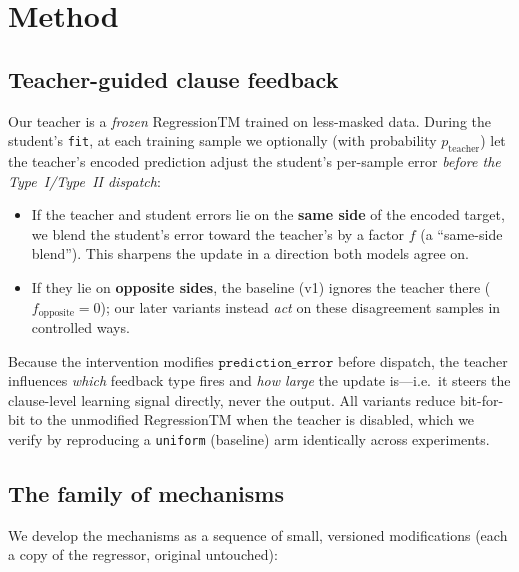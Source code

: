 \section{Method}
\label{sec:method}

\subsection{Teacher-guided clause feedback}

Our teacher is a \emph{frozen} RegressionTM trained on less-masked data. During the
student's \texttt{fit}, at each training sample we optionally (with probability
$p_{\text{teacher}}$) let the teacher's encoded prediction adjust the student's
per-sample error \emph{before the Type~I/Type~II dispatch}:

\begin{itemize}
  \item If the teacher and student errors lie on the \textbf{same side} of the encoded
    target, we blend the student's error toward the teacher's by a factor $f$ (a
    ``same-side blend''). This sharpens the update in a direction both models agree on.
  \item If they lie on \textbf{opposite sides}, the baseline (v1) ignores the teacher
    there ($f_{\text{opposite}}=0$); our later variants instead \emph{act} on these
    disagreement samples in controlled ways.
\end{itemize}

Because the intervention modifies $\texttt{prediction\_error}$ before dispatch, the
teacher influences \emph{which} feedback type fires and \emph{how large} the update
is---i.e.\ it steers the clause-level learning signal directly, never the output. All
variants reduce bit-for-bit to the unmodified RegressionTM when the teacher is disabled,
which we verify by reproducing a \texttt{uniform} (baseline) arm identically across
experiments.

\subsection{The family of mechanisms}

We develop the mechanisms as a sequence of small, versioned modifications (each a copy
of the regressor, original untouched):

